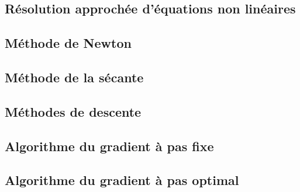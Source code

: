 \subsection{Résolution approchée d'équations non linéaires}
\subsection{Méthode de Newton}



\subsection{Méthode de la sécante}
\subsection{Méthodes de descente}
\subsection{Algorithme du gradient à pas fixe}
\subsection{Algorithme du gradient à pas optimal}







	










